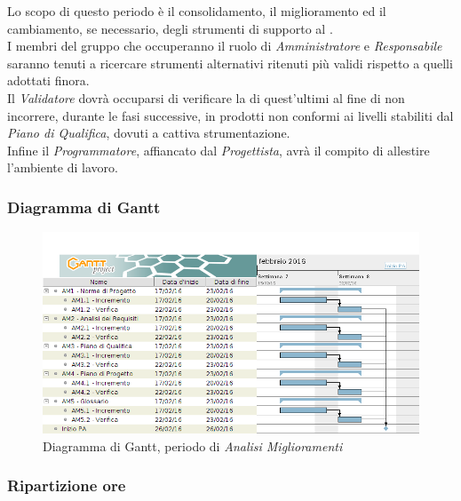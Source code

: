 Lo scopo di questo periodo \`e il consolidamento, il miglioramento ed il cambiamento, se necessario, degli strumenti di supporto al .\\
I membri del gruppo che occuperanno il ruolo di \textit{Amministratore} e \textit{Responsabile} saranno tenuti a ricercare strumenti alternativi ritenuti pi\`u validi rispetto a quelli adottati finora.\\
Il \textit{Validatore} dovr\`a occuparsi di verificare la  di quest'ultimi al fine di non incorrere, durante le fasi successive, in prodotti non conformi ai livelli stabiliti dal \textit{Piano di Qualifica}, dovuti a cattiva strumentazione.\\
Infine il \textit{Programmatore}, affiancato dal \textit{Progettista}, avr\`a il compito di allestire l'ambiente di lavoro.

\subsubsection{Diagramma di Gantt}
\begin{figure}[ht!]
\includegraphics[width=1\textwidth]{res/img/pianificazione/AnalisiMiglioramenti.png}
\caption{Diagramma di Gantt, periodo di \textit{Analisi Miglioramenti}}
\end{figure}


\subsubsection{Ripartizione ore}

